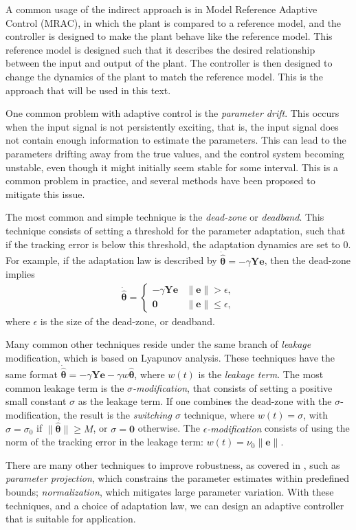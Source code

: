 A common usage of the indirect approach is in Model Reference Adaptive Control (MRAC), in which the plant is compared to a reference model, and the controller is designed to make the plant behave like the reference model. This reference model is designed such that it describes the desired relationship between the input and output of the plant. The controller is then designed to change the dynamics of the plant to match the reference model. This is the approach that will be used in this text.

One common problem with adaptive control is the \emph{parameter drift}. This occurs when the input signal is not persistently exciting, that is, the input signal does not contain enough information to estimate the parameters. This can lead to the parameters drifting away from the true values, and the control system becoming unstable, even though it might initially seem stable for some interval. This is a common problem in practice, and several methods have been proposed to mitigate this issue.

The most common and simple technique is the \emph{dead-zone} or \emph{deadband}. This technique consists of setting a threshold for the parameter adaptation, such that if the tracking error is below this threshold, the adaptation dynamics are set to $0$. For example, if the adaptation law is described by $\dot{\widehat{\boldsymbol{\theta}}} = -\gamma\mathbf{Y}\mathbf{e}$, then the dead-zone implies
\begin{align*}
    \dot{\widehat{\boldsymbol{\theta}}} = \begin{cases}
        -\gamma\mathbf{Y}\mathbf{e} &\|\mathbf{e}\| > \epsilon,\\
        \mathbf{0} & \|\mathbf{e}\| \le \epsilon,
    \end{cases}
\end{align*}
where $\epsilon$ is the size of the dead-zone, or deadband.

Many common other techniques reside under the same branch of \emph{leakage} modification, which is based on Lyapunov analysis. These techniques have the same format $\dot{\widehat{\boldsymbol{\theta}}} = -\gamma\mathbf{Y}\mathbf{e} - \gamma w\widehat{\boldsymbol{\theta}}$, where $w(t)$ is the \emph{leakage term}. The most common leakage term is the \emph{$\sigma$-modification}, that consists of setting a positive small constant $\sigma$ as the leakage term. If one combines the dead-zone with the $\sigma$-modification, the result is the \emph{switching $\sigma$} technique, where $w(t)=\sigma$, with $\sigma=\sigma_0$ if $\|\widehat{\boldsymbol{\theta}}\|\ge M$, or $\sigma=\mathbf{0}$ otherwise. The \emph{$\epsilon$-modification} consists of using the norm of the tracking error in the leakage term: $w(t) = \nu_0\|\mathbf{e}\|$.

There are many other techniques to improve robustness, as covered in \citet[ch. 8]{Ioannou2012}, such as \emph{parameter projection}, which constrains the parameter estimates within predefined bounds; \emph{normalization}, which mitigates large parameter variation. With these techniques, and a choice of adaptation law, we can design an adaptive controller that is suitable for application.